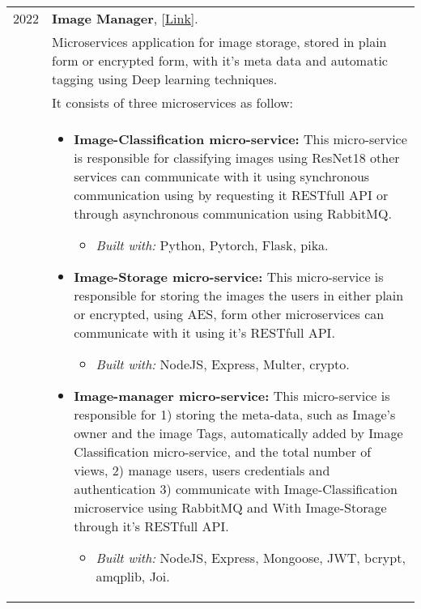 \documentclass[a4paper,10pt]{article}
\begin{document}
\begin{longtable}{r p{16cm}}
        2022  & \textbf{Image Manager}, [\href{https://github.com/zaky-fetoh/image-maneger-microservices-app}{Link}].  \\& Microservices application for image storage, stored in plain form or encrypted form, with it's meta data and automatic tagging using Deep learning techniques. \\&
        It consists of three microservices as follow:\\&
        \begin{itemize}
            \item \textbf{Image-Classification micro-service:}
            This micro-service is responsible for classifying images using ResNet18 other services can communicate with it using synchronous communication using by 
            requesting it RESTfull API or through asynchronous communication using RabbitMQ.
            \begin{itemize}
                \item \textit{Built with: } Python, Pytorch, Flask, pika.
            \end{itemize}
        \end{itemize}
        \begin{itemize}
            \item \textbf{Image-Storage micro-service:}
            This micro-service is responsible for storing the images the users in either plain or encrypted, using AES, form other microservices can communicate with it using it's RESTfull API.
            \begin{itemize}
                \item \textit{Built with: } NodeJS, Express, Multer, crypto.
            \end{itemize}
        \end{itemize}
        \begin{itemize}
            \item \textbf{Image-manager micro-service:}
            This micro-service is responsible for 1) storing the meta-data, such as Image's owner and the image Tags, automatically added by Image Classification micro-service, and the total number of views, 2) manage users, users credentials and authentication 3) communicate with Image-Classification microservice using RabbitMQ and With Image-Storage through it's RESTfull API.
            \begin{itemize}
                \item \textit{Built with: }NodeJS, Express, Mongoose, JWT, bcrypt, amqplib, Joi.

\end{itemize}
\end{itemize}
\end{longtable}
\end{document}
